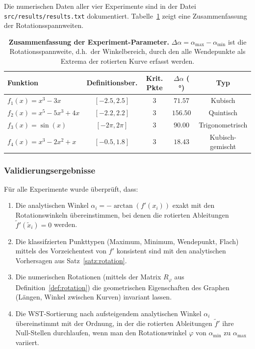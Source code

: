 ﻿\documentclass[12pt, a4paper]{article}
\theoremstyle{definition}
\begin{document}
	Die numerischen Daten aller vier Experimente sind in der Datei \texttt{src/results/results.txt}
	dokumentiert. Tabelle~\ref{tab:summary_stats} zeigt eine Zusammenfassung der Rotationsspannweiten.
	
	\begin{table}[H]
		\centering
		\begin{tabular}{|l|c|c|c|c|}
			\hline
			\textbf{Funktion} & \textbf{Definitionsber.} & \textbf{Krit. Pkte} & \textbf{$\Delta \alpha$ ( °)} & \textbf{Typ} \\
			\hline
			$f_1(x) = x^3 - 3x$ & $[-2.5, 2.5]$ & 3 & $71.57$ & Kubisch \\
			$f_2(x) = x^5 - 5x^3 + 4x$ & $[-2.2, 2.2]$ & 3 & $156.50$ & Quintisch \\
			$f_3(x) = \sin(x)$ & $[-2\pi, 2\pi]$ & 3 & $90.00$ & Trigonometrisch \\
			$f_4(x) = x^3 - 2x^2 + x$ & $[-0.5, 1.8]$ & 3 & $18.43$ & Kubisch-gemischt \\
			\hline
		\end{tabular}
		\caption{
			\textbf{Zusammenfassung der Experiment-Parameter.}
			$\Delta \alpha = \alpha_\mathrm{max} - \alpha_\mathrm{min}$ ist die Rotationsspannweite,
			d.h.\ der Winkelbereich, durch den alle Wendepunkte als Extrema der rotierten Kurve erfasst werden.
		}
		\label{tab:summary_stats}
	\end{table}
	
	\subsubsection{Validierungsergebnisse}
	
	Für alle Experimente wurde überprüft, dass:
	
	\begin{enumerate}[label=\textbf{\arabic*.}]
		\item Die analytischen Winkel $\alpha_i = -\arctan(f'(x_i))$ exakt mit den
		Rotationswinkeln übereinstimmen, bei denen die rotierten Ableitungen $\tilde{f}'(\tilde{x}_i) = 0$ werden.
		
		\item Die klassifzierten Punkttypen (Maximum, Minimum, Wendepunkt, Flach)
		mittels des Vorzeichentest von $f'$ konsistent sind mit den analytischen Vorhersagen
		aus Satz~\ref{satz:rotation}.
		
		\item Die numerischen Rotationen (mittels der Matrix $R_\varphi$ aus Definition~\ref{def:rotation})
		die geometrischen Eigenschaften des Graphen (Längen, Winkel zwischen Kurven) invariant lassen.
		
		\item Die WST-Sortierung nach aufsteigendem analytischen Winkel $\alpha_i$ übereinstimmt mit
		der Ordnung, in der die rotierten Ableitungen $\tilde{f}'$ ihre Null-Stellen durchlaufen,
		wenn man den Rotationswinkel $\varphi$ von $\alpha_\mathrm{min}$ zu $\alpha_\mathrm{max}$ variiert.
	\end{enumerate}
	
\end{document}
